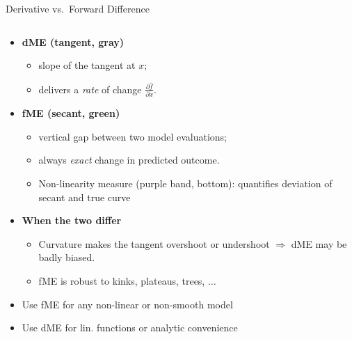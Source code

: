 \documentclass[11pt,compress,t,notes=noshow, aspectratio=169, xcolor=table]{beamer}
\begin{document}


\begin{frame}{Derivative vs.\ Forward Difference}

\begin{columns}[T,onlytextwidth]
\begin{column}{0.67\textwidth}
\begin{itemize}%
  \item \textbf{dME (tangent, gray)}
        \begin{itemize}
            \item slope of the tangent at \(x\);
            \item delivers a \emph{rate} of change \(\tfrac{\partial\widehat f}{\partial x}\).
        \end{itemize}
  \item \textbf{fME (secant, green)}
        \begin{itemize}
            \item vertical gap between two model evaluations;
            \item always \emph{exact} change in predicted outcome.
            \item Non-linearity measure (purple band, bottom): quantifies deviation of secant and true curve 
        \end{itemize}

  \item \textbf{When the two differ}
        \begin{itemize}
            \item Curvature makes the tangent overshoot or undershoot  
                  \(\Rightarrow\) dME may be badly biased.
            \item fME is robust to kinks, plateaus, trees, $\dots$
        \end{itemize}
    \item<2-> Use fME for any non-linear or non-smooth model
    \item<2-> Use dME for lin. functions or analytic convenience
\end{itemize}


\end{column}
\end{columns}
\end{frame}
\end{document}
